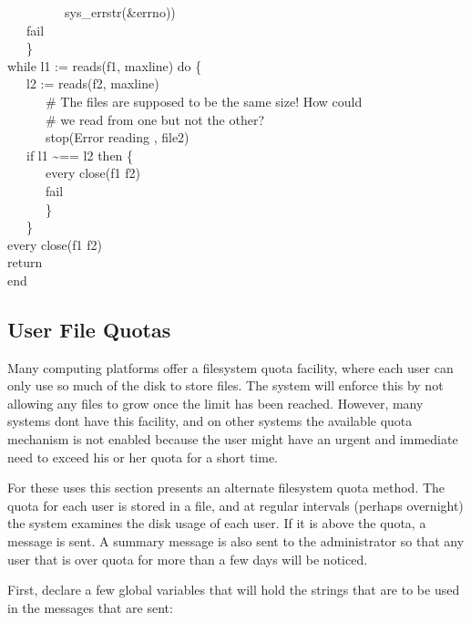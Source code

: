 {\>   \ \ \ \ \ \ \ \ \ sys\_errstr(\&errno)) \\
\>   \ \ \ fail \\
\>   \ \ \ \} \\
\>   while l1 := reads(f1, maxline) do \{ \\
\>   \ \ \ l2 := reads(f2, maxline) {\textbar} \\
\>   \ \ \ \ \ \ \# The files are supposed to be the same size! How
could \\
\>   \ \ \ \ \ \ \# we read from one but not the other? \\
\>   \ \ \ \ \ \ stop({\textquotedbl}Error reading {\textquotedbl},
file2) \\
\>   \ \ \ if l1 \~{}== l2 then \{ \\
\>   \ \ \ \ \ \ every close(f1 {\textbar} f2) \\
\>   \ \ \ \ \ \ fail \\
\>   \ \ \ \ \ \ \} \\
\>   \ \ \ \} \\
\>   every close(f1 {\textbar} f2) \\
\>   return \\
end
}

\subsection{User File Quotas}

Many computing platforms offer a filesystem quota facility,
where each user can only use so much of the disk to store files. The
system will enforce this by not allowing any files to grow once the
limit has been reached. However, many systems don{\textquotesingle}t
have this facility, and on other systems the available quota mechanism
is not enabled because the user might have an urgent and immediate need
to exceed his or her quota for a short time.

For these uses this section presents an alternate filesystem quota
method. The quota for each user is stored in a file, and at regular
intervals (perhaps overnight) the system examines the disk usage of
each user. If it is above the quota, a message is sent. A summary
message is also sent to the administrator so that any user that is over
quota for more than a few days will be noticed.

First, declare a few global variables that will hold the strings that
are to be used in the messages that are sent: 


